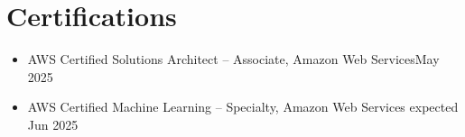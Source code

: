 \documentclass[letterpaper,11pt]{article}
\newcommand{\resumeItem}[1]{
\justifying
  \item{\small{#1}}
  \vspace{-2px}
}
\newcommand{\resumeItemListStart}{
  \vspace{-5pt}
  \begin{itemize}[leftmargin=0.21in, label=\textbullet]
}
\newcommand{\resumeItemListEnd}{\end{itemize}}
\begin{document}
\vspace{-21pt}
\section{\Large{Certifications}}
\vspace{5pt}
\resumeItemListStart
\resumeItem{AWS Certified Solutions Architect – Associate, Amazon Web Services\hfill{May 2025}}
\resumeItem{\vspace{-5pt}AWS Certified Machine Learning – Specialty, Amazon Web Services \hfill{expected Jun 2025}}

\resumeItemListEnd
\end{document}
